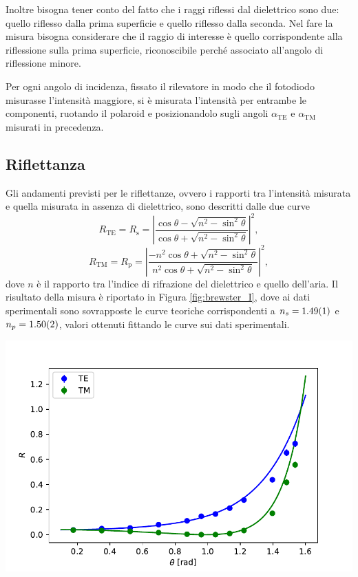 \documentclass[10pt,oneside,a4paper]{article}
\newenvironment{Figure}
  {\par\medskip\noindent\minipage{\linewidth}}
  {\endminipage\par\medskip}
\begin{document}
\begin{multicols}{2}
Inoltre bisogna tener conto del fatto che i raggi riflessi dal dielettrico sono due: quello riflesso dalla prima superficie e quello riflesso dalla seconda. Nel fare la misura bisogna considerare che il raggio di interesse è quello corrispondente alla riflessione sulla prima superficie, riconoscibile perché associato all'angolo di riflessione minore.

Per ogni angolo di incidenza, fissato il rilevatore in modo che il fotodiodo misurasse l'intensità maggiore, si è misurata l'intensità per entrambe le componenti, ruotando il polaroid e posizionandolo sugli angoli $\alpha_{\text{TE}}$ e $\alpha_{\text{TM}}$ misurati in precedenza.

\subsection{Riflettanza}
Gli andamenti previsti per le riflettanze, ovvero i rapporti tra l'intensità misurata e quella misurata in assenza di dielettrico, sono descritti dalle due curve
\begin{equation}\label{eq:rs}
	R_{\mathrm{TE}} = R_\mathrm{s} = \left\vert \frac{\cos \theta - \sqrt{n^2 - \sin^2 \theta}}{\cos \theta + \sqrt{n^2 - \sin^2 \theta}} \right\vert^2,
\end{equation}
\begin{equation}\label{eq:rs}
	R_{\mathrm{TM}} = R_\mathrm{p} =  \left\vert \frac{-n^2 \cos \theta + \sqrt{n^2 - \sin^2 \theta}}{n^2 \cos \theta + \sqrt{n^2 - \sin^2 \theta}} \right\vert^2,
\end{equation}
dove $n$ è il rapporto tra l'indice di rifrazione del dielettrico e quello dell'aria.
Il risultato della misura è riportato in Figura \ref{fig:brewster_I}, dove ai dati sperimentali sono sovrapposte le curve teoriche corrispondenti a $n_s = \SI{1.49 \pm 0.01}{}$ e $n_p = \SI{1.50 \pm 0.02}{}$, valori ottenuti fittando le curve sui dati sperimentali.
\begin{Figure}
	\begin{center}
	\includegraphics[width=\linewidth]{riflettanze.pdf}
	\label{fig:brewster_I}
	\end{center}
\end{Figure}


\end{multicols}
\end{document}

